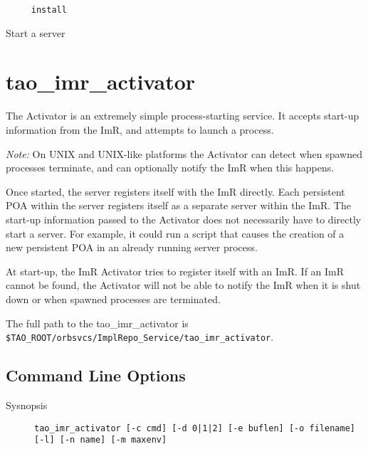 
\begin{verbatim}
     install
\end{verbatim}

Start a server



\section{tao\_imr\_activator}
\label{tao\_imr\_activator}

The Activator is an extremely simple process-starting service. It accepts start-up information from the ImR,
and attempts to launch a process.

\emph {Note:} On UNIX and UNIX-like platforms the Activator can detect when spawned processes
terminate, and can optionally notify the ImR when this happens.

Once started, the server registers itself with the ImR directly. Each persistent POA within the server registers
itself as a separate server within the ImR.   The start-up information passed to the Activator does not necessarily
 have to directly start a server. For example, it could run a script that causes the creation of a new persistent
POA in an already running server process.

At start-up, the ImR Activator tries to register itself with an ImR. If an ImR cannot be found, the Activator
will not be able to notify the ImR when it is shut down or when spawned processes are terminated.

The full path to the tao\_imr\_activator is {\tt \$TAO\_ROOT/orbsvcs/ImplRepo\_Service/tao\_imr\_activator}.

\subsection{Command Line Options}

\begin{description}
\item[Sysnopsis] {\tt tao\_imr\_activator [-c cmd] [-d 0|1|2] [-e buflen] [-o filename] [-l] [-n name] [-m maxenv]}
\end{description}

